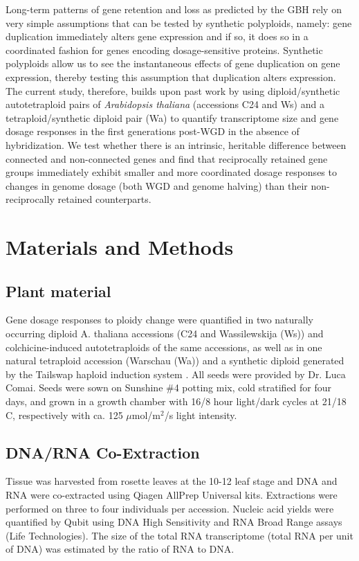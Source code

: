 \documentclass[11pt]{article}
\begin{document}
Long-term patterns of gene retention and loss as predicted by the GBH rely on very simple assumptions that can be tested by synthetic polyploids, namely: gene duplication immediately alters gene expression and if so, it does so in a coordinated fashion for genes encoding dosage-sensitive proteins. Synthetic polyploids allow us to see the instantaneous effects of gene duplication on gene expression, thereby testing this assumption that duplication alters expression. The current study, therefore, builds upon past work by using diploid/synthetic autotetraploid pairs of {\it Arabidopsis thaliana} (accessions C24 and Ws) and a tetraploid/synthetic diploid pair (Wa) to quantify transcriptome size and gene dosage responses in the first generations post-WGD in the absence of hybridization.  We test whether there is an intrinsic, heritable difference between connected and non-connected genes and find that reciprocally retained gene groups immediately exhibit smaller and more coordinated dosage responses to changes in genome dosage (both WGD and genome halving) than their non-reciprocally retained counterparts.

\section*{Materials and Methods}
\subsection*{Plant material}
Gene dosage responses to ploidy change were quantified in two naturally occurring diploid A. thaliana accessions (C24 and Wassilewskija (Ws)) and colchicine-induced autotetraploids of the same accessions, as well as in one natural tetraploid accession (Warschau (Wa)) and a synthetic diploid generated by the Tailswap haploid induction system \citep{ravi2010}. All seeds were provided by Dr. Luca Comai. Seeds were sown on Sunshine \#4 potting mix, cold stratified for four days, and grown in a growth chamber with 16/8 hour light/dark cycles at 21/18 C, respectively with ca. 125 $\mu$mol/m$^2$/s light intensity. 

\subsection*{DNA/RNA Co-Extraction}
Tissue was harvested from rosette leaves at the 10-12 leaf stage and DNA and RNA were co-extracted using Qiagen AllPrep Universal kits. Extractions were performed on three to four individuals per accession. Nucleic acid yields were quantified by Qubit using DNA High Sensitivity and RNA Broad Range assays (Life Technologies). The size of the total RNA transcriptome (total RNA per unit of DNA) was estimated by the ratio of RNA to DNA.
\end{document}
